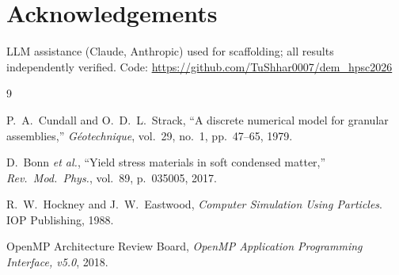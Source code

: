 \documentclass[10pt,twocolumn]{article}
\begin{document}
\section*{Acknowledgements}
LLM assistance (Claude, Anthropic) used for scaffolding; all results
independently verified.
Code: \url{https://github.com/TuShhar0007/dem_hpsc2026}


\begin{thebibliography}{9}

P.~A.~Cundall and O.~D.~L.~Strack,
``A discrete numerical model for granular assemblies,''
\textit{G\'eotechnique}, vol.~29, no.~1, pp.~47--65, 1979.

D.~Bonn \textit{et al.},
``Yield stress materials in soft condensed matter,''
\textit{Rev.\ Mod.\ Phys.}, vol.~89, p.~035005, 2017.

R.~W.~Hockney and J.~W.~Eastwood,
\textit{Computer Simulation Using Particles}.
IOP Publishing, 1988.

OpenMP Architecture Review Board,
\textit{OpenMP Application Programming Interface, v5.0}, 2018.

\end{thebibliography}
\end{document}
